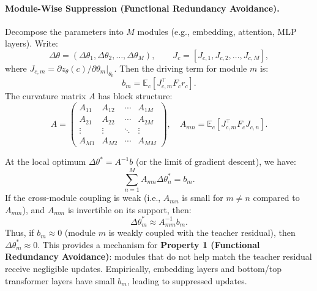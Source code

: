 \documentclass{llmxive}
\begin{document}
\paragraph{Module-Wise Suppression (Functional Redundancy Avoidance).}
Decompose the parameters into \(M\) modules (e.g., embedding, attention, MLP layers). Write:
\begin{equation}
\Delta\theta = (\Delta\theta_1, \Delta\theta_2, \dots, \Delta\theta_M), \qquad
J_c = [J_{c,1}, J_{c,2}, \dots, J_{c,M}],
\end{equation}
where \(J_{c,m} = \partial z_{\theta}(c)/\partial \theta_m|_{\theta_0}\).  
Then the driving term for module \(m\) is:
\begin{equation}
b_m = \mathbb{E}_c[ J_{c,m}^{\top} F_c r_c ].
\end{equation}
The curvature matrix \(A\) has block structure:
\begin{equation}
A = \begin{pmatrix}
A_{11} & A_{12} & \cdots & A_{1M} \\
A_{21} & A_{22} & \cdots & A_{2M} \\
\vdots  & \vdots  & \ddots & \vdots  \\
A_{M1} & A_{M2} & \cdots & A_{MM}
\end{pmatrix},
\quad A_{mn} = \mathbb{E}_c[J_{c,m}^{\top} F_c J_{c,n}].
\end{equation}

At the local optimum \(\Delta\theta^* = A^{-1}b\) (or the limit of gradient descent), we have:
\begin{equation}
\sum_{n=1}^{M} A_{mn} \Delta\theta_n^* = b_m.
\end{equation}
If the cross-module coupling is weak (i.e., \(A_{mn}\) is small for \(m\ne n\) compared to \(A_{mm}\)), and \(A_{mm}\) is invertible on its support, then:
\begin{equation}
\Delta\theta_m^* \approx A_{mm}^{-1} b_m.
\end{equation}
Thus, if \(b_m \approx 0\) (module \(m\) is weakly coupled with the teacher residual), then \(\Delta\theta_m^* \approx 0\). This provides a mechanism for \textbf{Property 1 (Functional Redundancy Avoidance)}: modules that do not help match the teacher residual receive negligible updates. Empirically, embedding layers and bottom/top transformer layers have small \(b_m\), leading to suppressed updates.
\end{document}

